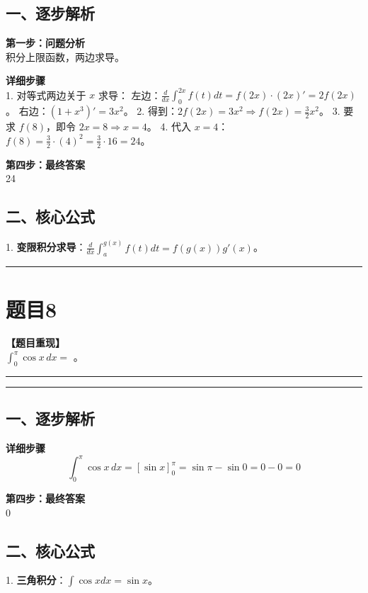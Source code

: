 \documentclass[12pt, a4paper]{ctexart}
\newcommand{\TopSeparator}{
    \par\noindent\rule{\textwidth}{1.5pt}\vspace{0.5em} %
}
\newcommand{\AnalysisSeparator}{
    \par\noindent\rule{\textwidth}{0.5pt}\vspace{0.2em}\hrule\vspace{0.5em} %
}
\newenvironment{RedAnalysis}{
    \par
    \color{red} %
}{
    \par
    \color{black} %
}
\begin{document}
\begin{RedAnalysis}

\subsection*{一、逐步解析}

\textbf{第一步：问题分析} \\
积分上限函数，两边求导。

\textbf{详细步骤} \\
1. 对等式两边关于 $x$ 求导：
   左边：$\frac{d}{dx} \int_0^{2x} f(t) dt = f(2x) \cdot (2x)' = 2f(2x)$。
   右边：$(1+x^3)' = 3x^2$。
2. 得到：$2f(2x) = 3x^2 \Rightarrow f(2x) = \frac{3}{2}x^2$。
3. 要求 $f(8)$，即令 $2x = 8 \Rightarrow x = 4$。
4. 代入 $x=4$：
   $f(8) = \frac{3}{2} \cdot (4)^2 = \frac{3}{2} \cdot 16 = 24$。

\textbf{第四步：最终答案} \\
24

\subsection*{二、核心公式}
1. \textbf{变限积分求导}：$\frac{d}{dx} \int_a^{g(x)} f(t) dt = f(g(x))g'(x)$。

\end{RedAnalysis}

\vspace{2em}

\TopSeparator
\section*{题目8}

\textbf{【题目重现】} \\
$ \int_{0}^{\pi}\cos x \, dx= $ \underline{\hspace{2cm}}。

\AnalysisSeparator

\begin{RedAnalysis}

\subsection*{一、逐步解析}

\textbf{详细步骤} \\
\[ \int_{0}^{\pi}\cos x \, dx = [\sin x]_0^{\pi} = \sin \pi - \sin 0 = 0 - 0 = 0 \]

\textbf{第四步：最终答案} \\
0

\subsection*{二、核心公式}
1. \textbf{三角积分}：$\int \cos x dx = \sin x$。

\end{RedAnalysis}
\end{document}
